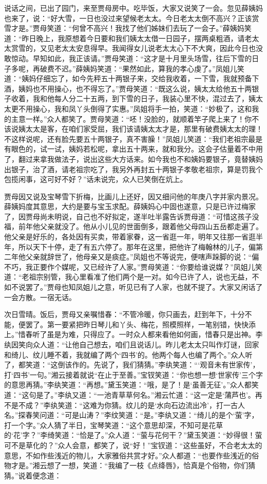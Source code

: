 \documentclass[12pt,oneside]{book}
\begin{document}
说话之间，已出了园门，来至贾母房中。吃毕饭，大家又说笑了一会。忽见薛姨妈也来了，说：“好大雪，一日也没过来望候老太太。今日老太太倒不高兴？正该赏雪才是。”贾母笑道：“何曾不高兴！我找了他们姊妹们去玩了一会子。”薛姨妈笑道：“昨日晚上，我原想着今日要和我们姨太太借一日园子，摆两桌粗酒，请老太太赏雪的，又见老太太安息得早。我闻得女儿说老太太心下不大爽，因此今日也没敢惊动。早知如此，我正该请。”贾母笑道：“这才是十月里头场雪，往后下雪的日子多呢，再破费不迟。”薛姨妈笑道：“果然如此，算我的孝心虔了。”凤姐儿笑道：“姨妈仔细忘了，如今先秤五十两银子来，交给我收着，一下雪，我就预备下酒，姨妈也不用操心，也不得忘了。”贾母笑道：“既这么说，姨太太给他五十两银子收着，我和他每人分二十五两，到下雪的日子，我装心里不快，混过去了，姨太太更不用操心，我和凤丫头倒得了实惠。”凤姐将手一拍，笑道：“妙极了，这和我的主意一样。”众人都笑了。贾母笑道：“呸！没脸的，就顺着竿子爬上来了！你不该说姨太太是客，在咱们家受屈，我们该请姨太太才是，那里有破费姨太太的理！不这样说呢，还有脸先要五十两银子，真不害臊！”凤姐儿笑道：“我们老祖宗最是有眼色的，试一试，姨妈若松呢，拿出五十两来，就和我分。这会子估量着不中用了，翻过来拿我做法子，说出这些大方话来。如今我也不和姨妈要银子，竟替姨妈出银子，治了酒，请老祖宗吃了，我另外再封五十两银子孝敬老祖宗，算是罚我个包揽闲事，这可好不好？”话未说完，众人已笑倒在炕上。

贾母因又说及宝琴雪下折梅，比画儿上还好，因又细问他的年庚八字并家内景况。薛姨妈度其意思，大约是要与宝玉求配。薛姨妈心中固也遂意，只是已许过梅家了，因贾母尚未明说，自己也不好拟定，遂半吐半露告诉贾母道：“可惜这孩子没福，前年他父亲就没了。他从小儿见的世面倒多，跟着他父母四山五岳都走遍了。他父亲是好乐的，各处因有买卖，带着家眷，这一省逛一年，明年又往那一省逛半年，所以天下十停，走了有五六停了。那年在这里，把他许了梅翰林的儿子，偏第二年他父亲就辞世了，他母亲又是痰症。”凤姐也不等说完，便嗐声跺脚的说：“偏不巧，我正要作个媒呢，又已经许了人家。”贾母笑道：“你要给谁说媒？”凤姐儿笑道：“老祖宗别管，我心里看准了他们两个是一对。如今已许了人，说也无益，不如不说罢了。”贾母也知凤姐儿之意，听见已有了人家，也就不提了。大家又闲话了一会方散。一宿无话。

次日雪晴。饭后，贾母又亲嘱惜春：“不管冷暖，你只画去，赶到年下，十分不能，便罢了。第一要紧把昨日琴儿和丫头、梅花，照模照样，一笔别错，快快添上。”惜春听了虽是为难，只得应了。一时众人都来看他如何画，惜春只是出神。李纨因笑向众人道：“让他自己想去，咱们且说话儿。昨儿老太太只叫作灯谜，回家和绮儿、纹儿睡不着，我就编了两个‘四书’的。他两个每人也编了两个。”众人听了，都笑道：“这倒该作的。先说了，我们猜猜。”李纨笑道：“‘观音未有世家传’，打‘四书’一句。”湘云接着就说“在止于至善。”宝钗笑道：“你也想一想‘世家传’三个字的意思再猜。”李纨笑道：“再想。”黛玉笑道：“哦，是了！是‘虽善无征’。”众人都笑道：“这句是了。”李纨又道：“一池青草草何名。”湘云忙道：“这一定是‘蒲芦也’。再不是不成？”李纨笑道：“这难为你猜。纹儿的是‘水向石边流出冷’，打一古人名。”探春笑问道：“可是山涛？”李纹笑道：“是。”李纨又道：“绮儿的是个‘萤’字，打一个字。”众人猜了半日，宝琴笑道：“这个意思却深，不知可是花草的‘花’字？”李绮笑道：“恰是了。”众人道：“萤与花何干？”黛玉笑道：“妙得很！萤可不是草化的？”众人会意，都笑了，说“好！”宝钗道：“这些虽好，不合老太太的意思，不如作些浅近的物儿，大家雅俗共赏才好。”众人都道：“也要作些浅近的俗物才是。”湘云想了一想，笑道：“我编了一枝《点绛唇》，恰真是个俗物，你们猜猜。”说着便念道：
\end{document}
